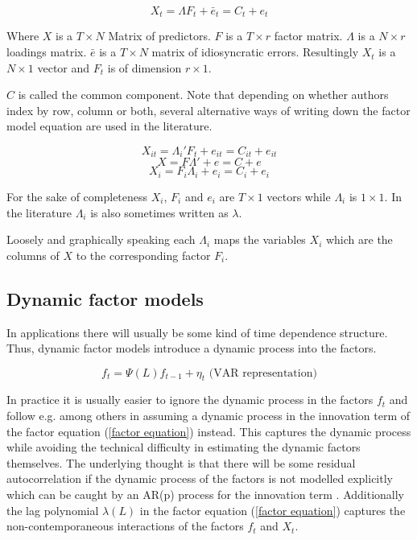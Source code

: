 \documentclass[12pt]{article}
\begin{document}
\begin{equation}
	\label{factor equation, t indexed}
	X_t = \Lambda F_t + \bar e_t = C_t + e_t
\end{equation}

Where $X$ is a $T \times N$ Matrix of predictors. $F$ is a $T \times r$ factor matrix. $\Lambda$ is a $N \times r$ loadings matrix. $\bar e$ is a $T \times N$ matrix of idiosyncratic errors. Resultingly $X_t$ is a $N \times 1$ vector and $F_t$ is of dimension $r \times 1$.


$C$ is called the common component.
Note that depending on whether authors index by row, column or both, several alternative ways of writing down the factor model equation are used in the literature.

\begin{equation}
	\label{factor equation, it indexed}
	X_{it} = \Lambda_i' F_t + e_{it} = C_{it} + e_{it}
\end{equation}
\begin{equation}
	\label{static factor equation}
	X = F \Lambda' + e = C + e
\end{equation}
\begin{equation}
	\label{factor equation, i indexed}
	X_i = F_i \Lambda_i + e_i = C_i + e_i
\end{equation}

For the sake of completeness $X_i$, $F_i$ and $e_i$ are $T \times 1$ vectors while $\Lambda_i$ is $1 \times 1$. In the literature $\Lambda_i$ is also sometimes written as $\lambda$.

Loosely and graphically speaking each $\Lambda_i$ maps the variables $X_i$ which are the columns of $X$ to the corresponding factor $F_i$.



\subsection{Dynamic factor models}
In applications there will usually be some kind of time dependence structure. Thus, dynamic factor models introduce a dynamic process into the factors.

\begin{equation}
	\label{time dependence of factors}
	f_t = \Psi(L) f_{t-1} + \eta_t \text{\ \ \ \ \ (VAR representation)}
\end{equation}

In practice it is usually easier to ignore the dynamic process in the factors $f_t$ and follow e.g. \citet{stock2005implications} among others in assuming a dynamic process in the innovation term of the factor equation (\ref{factor equation}) instead. This captures the dynamic process while avoiding the technical difficulty in estimating the dynamic factors themselves. The underlying thought is that there will be some residual autocorrelation if the dynamic process of the factors is not modelled explicitly which can be caught by an AR(p) process for the innovation term \citep{breitung2011gls}. Additionally the lag polynomial $\lambda(L)$ in the factor equation (\ref{factor equation}) captures the non-contemporaneous interactions of the factors $f_t$ and $X_t$.
\end{document}
